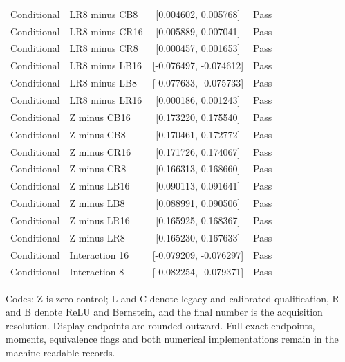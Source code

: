 {\begin{longtable}{llcr}
Conditional & LR8 minus CB8 & [0.004602, 0.005768] & Pass \\
Conditional & LR8 minus CR16 & [0.005889, 0.007041] & Pass \\
Conditional & LR8 minus CR8 & [0.000457, 0.001653] & Pass \\
Conditional & LR8 minus LB16 & [-0.076497, -0.074612] & Pass \\
Conditional & LR8 minus LB8 & [-0.077633, -0.075733] & Pass \\
Conditional & LR8 minus LR16 & [0.000186, 0.001243] & Pass \\
Conditional & Z minus CB16 & [0.173220, 0.175540] & Pass \\
Conditional & Z minus CB8 & [0.170461, 0.172772] & Pass \\
Conditional & Z minus CR16 & [0.171726, 0.174067] & Pass \\
Conditional & Z minus CR8 & [0.166313, 0.168660] & Pass \\
Conditional & Z minus LB16 & [0.090113, 0.091641] & Pass \\
Conditional & Z minus LB8 & [0.088991, 0.090506] & Pass \\
Conditional & Z minus LR16 & [0.165925, 0.168367] & Pass \\
Conditional & Z minus LR8 & [0.165230, 0.167633] & Pass \\
Conditional & Interaction 16 & [-0.079209, -0.076297] & Pass \\
Conditional & Interaction 8 & [-0.082254, -0.079371] & Pass \\
\bottomrule\end{longtable}}
\noindent Codes: Z is zero control; L and C denote legacy and calibrated qualification, R and B denote ReLU and Bernstein, and the final number is the acquisition resolution. Display endpoints are rounded outward. Full exact endpoints, moments, equivalence flags and both numerical implementations remain in the machine-readable records.
